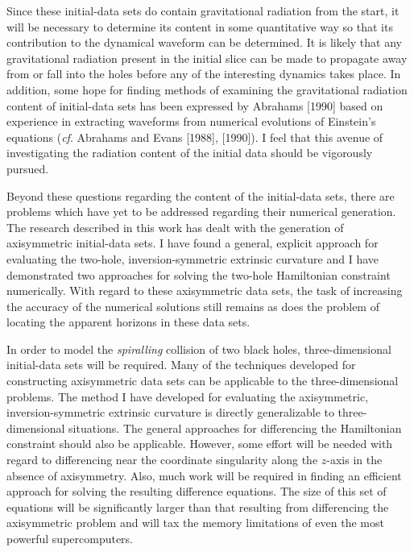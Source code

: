Since these initial-data sets do contain gravitational radiation from the start,
it will be necessary to determine its content in some quantitative way so that
its contribution to the dynamical waveform can be determined.  It is likely
that any gravitational radiation present in the initial slice can be made to
propagate away from or fall into the holes before any of the interesting
dynamics takes place.  In addition, some hope for finding methods of examining
the gravitational radiation content of initial-data sets has been expressed by
Abrahams [1990] based on experience in extracting waveforms from numerical
evolutions of Einstein's equations ({\it cf}. Abrahams and Evans [1988],
[1990]).  I feel that this avenue of investigating the radiation content of the
initial data should be vigorously pursued.

Beyond these questions regarding the content of the initial-data sets, there are
problems which have yet to be addressed regarding their numerical generation. 
The research described in this work has dealt with the generation of
axisymmetric initial-data sets.  I have found a general, explicit approach for
evaluating the two-hole, inversion-symmetric extrinsic curvature and I have
demonstrated two approaches for solving the two-hole Hamiltonian constraint
numerically.  With regard to these axisymmetric data sets, the task of
increasing the accuracy of the numerical solutions still remains as does the
problem of locating the apparent horizons in these data sets.

In order to model the {\it spiralling} collision of two black holes,
three-dimensional initial-data sets will be required.  Many of the techniques
developed for constructing axisymmetric data sets can be applicable to the
three-dimensional problems.  The method I have developed for evaluating  the
axisymmetric, inversion-symmetric extrinsic curvature is directly generalizable
to three-dimensional situations.  The general approaches for differencing the
Hamiltonian constraint should also be applicable.  However, some effort will be
needed with regard to differencing near the coordinate singularity along the
$z$-axis in the absence of axisymmetry.  Also, much work will be required in
finding an efficient approach for solving the resulting difference equations. 
The size of this set of equations will be significantly larger than that
resulting from differencing the axisymmetric problem and will tax the memory
limitations of even the most powerful supercomputers.

